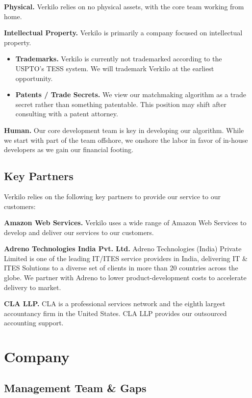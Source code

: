 \documentclass[10pt,openany]{book}
\providecommand{\tightlist}{%
  \setlength{\itemsep}{0pt}\setlength{\parskip}{0pt}}
\begin{document}
\textbf{Physical.} Verkilo relies on no physical assets, with the core
team working from home.

\textbf{Intellectual Property.} Verkilo is primarily a company focused
on intellectual property.

\begin{itemize}
\tightlist
\item
  \textbf{Trademarks.} Verkilo is currently not trademarked according to
  the USPTO's TESS system. We will trademark Verkilo at the earliest
  opportunity.
\item
  \textbf{Patents / Trade Secrets.} We view our matchmaking algorithm as
  a trade secret rather than something patentable. This position may
  shift after consulting with a patent attorney.
\end{itemize}

\textbf{Human.} Our core development team is key in developing our
algorithm. While we start with part of the team offshore, we onshore the
labor in favor of in-house developers as we gain our financial footing.

\hypertarget{key-partners}{%
\section{Key Partners}\label{key-partners}}

Verkilo relies on the following key partners to provide our service to
our customers:

\textbf{Amazon Web Services.} Verkilo uses a wide range of Amazon Web
Services to develop and deliver our services to our customers.

\textbf{Adreno Technologies India Pvt. Ltd.} Adreno Technologies (India)
Private Limited is one of the leading IT/ITES service providers in
India, delivering IT \& ITES Solutions to a diverse set of clients in
more than 20 countries across the globe. We partner with Adreno to lower
product-development costs to accelerate delivery to market.

\textbf{CLA LLP.} CLA is a professional services network and the eighth
largest accountancy firm in the United States. CLA LLP provides our
outsourced accounting support.

\hypertarget{company}{%
\chapter{Company}\label{company}}

\hypertarget{management-team-gaps}{%
\section{Management Team \& Gaps}\label{management-team-gaps}}
\end{document}
